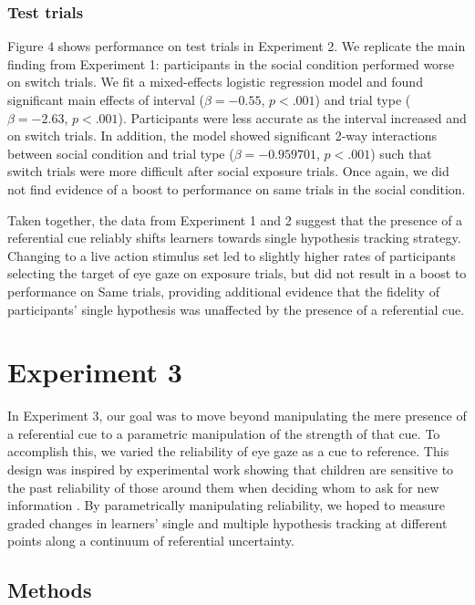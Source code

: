 \documentclass[10pt,letterpaper]{article}
\begin{document}
\subsubsection{Test trials}

Figure 4 shows performance on test trials in Experiment 2. We replicate the main finding from Experiment 1: participants in the social condition performed worse on switch trials. We fit a mixed-effects logistic regression model and found significant main effects of interval ($\beta=  -0.55$, $p< .001$) and trial type ($\beta=  -2.63$, $p< .001$). Participants were less accurate as the interval increased and on switch trials. In addition, the model showed significant 2-way interactions between social condition and trial type ($\beta=  -0.959701$, $p< .001$) such that switch trials were more difficult after social exposure trials. Once again, we did not find evidence of a boost to performance on same trials in the social condition. 

Taken together, the data from Experiment 1 and 2 suggest that the presence of a referential cue reliably shifts learners towards single hypothesis tracking strategy. Changing to a live action stimulus set led to slightly higher rates of participants selecting the target of eye gaze on exposure trials, but did not result in a boost to performance on Same trials, providing additional evidence that the fidelity of participants' single hypothesis was unaffected by the presence of a referential cue.


\section{Experiment 3}

In Experiment 3, our goal was to move beyond manipulating the mere presence of a referential cue to a parametric manipulation of the strength of that cue. To accomplish this, we varied the reliability of eye gaze as a cue to reference. This design was inspired by experimental work showing that children are sensitive to the past reliability of those around them when deciding whom to ask for new information \cite{koenig2004trust}. By parametrically manipulating reliability, we hoped to measure graded changes in learners' single and multiple hypothesis tracking at different points along a continuum of referential uncertainty.

\subsection{Methods}
\end{document}
